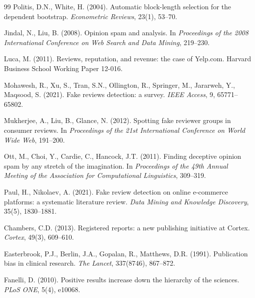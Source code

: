 \documentclass[11pt,a4paper]{article}
\begin{document}
\begin{thebibliography}{99}
Politis, D.N., White, H. (2004).
Automatic block-length selection for the dependent bootstrap.
\textit{Econometric Reviews}, 23(1), 53--70.


Jindal, N., Liu, B. (2008).
Opinion spam and analysis. In \textit{Proceedings of the 2008 International
Conference on Web Search and Data Mining}, 219--230.

Luca, M. (2011).
Reviews, reputation, and revenue: the case of Yelp.com.
Harvard Business School Working Paper 12-016.

Mohawesh, R., Xu, S., Tran, S.N., Ollington, R., Springer, M., Jararweh, Y.,
Maqsood, S. (2021).
Fake reviews detection: a survey.
\textit{IEEE Access}, 9, 65771--65802.

Mukherjee, A., Liu, B., Glance, N. (2012).
Spotting fake reviewer groups in consumer reviews. In \textit{Proceedings of
the 21st International Conference on World Wide Web}, 191--200.

Ott, M., Choi, Y., Cardie, C., Hancock, J.T. (2011).
Finding deceptive opinion spam by any stretch of the imagination. In
\textit{Proceedings of the 49th Annual Meeting of the Association for
Computational Linguistics}, 309--319.

Paul, H., Nikolaev, A. (2021).
Fake review detection on online e-commerce platforms: a systematic literature
review.
\textit{Data Mining and Knowledge Discovery}, 35(5), 1830--1881.


Chambers, C.D. (2013).
Registered reports: a new publishing initiative at Cortex.
\textit{Cortex}, 49(3), 609--610.

Easterbrook, P.J., Berlin, J.A., Gopalan, R., Matthews, D.R. (1991).
Publication bias in clinical research.
\textit{The Lancet}, 337(8746), 867--872.

Fanelli, D. (2010).
Positive results increase down the hierarchy of the sciences.
\textit{PLoS ONE}, 5(4), e10068.


\end{thebibliography}
\end{document}
